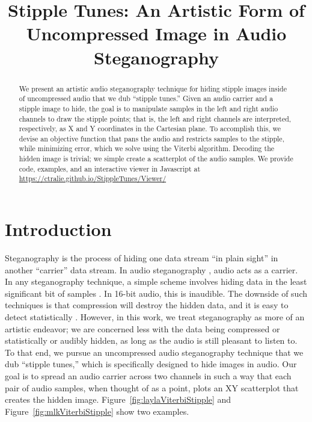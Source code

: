 \documentclass{article}
\title{Stipple Tunes: An Artistic Form of Uncompressed Image in Audio Steganography}
\begin{document}
%
\maketitle
%
\begin{abstract}
  We present an artistic audio steganography technique for hiding stipple images inside of uncompressed audio that we dub ``stipple tunes.''  Given an audio carrier and a stipple image to hide, the goal is to manipulate samples in the left and right audio channels to draw the stipple points; that is, the left and right channels are interpreted, respectively, as X and Y coordinates in the Cartesian plane.  To accomplish this, we devise an objective function that pans the audio and restricts samples to the stipple, while minimizing error, which we solve using the Viterbi algorithm.  Decoding the hidden image is trivial; we simple create a scatterplot of the audio samples.  We provide code, examples, and an interactive viewer in Javascript at \url{https://ctralie.github.io/StippleTunes/Viewer/}

\end{abstract}
%
\section{Introduction}\label{sec:introduction}

Steganography is the process of hiding one data stream ``in plain sight'' in another ``carrier'' data stream.  In audio steganography \cite{djebbar_comparative_2012, dutta_overview_2020}, audio acts as a carrier.  In any steganography technique, a simple scheme involves hiding data in the least significant bit of samples \cite{cvejic_wavelet_2002}.  In 16-bit audio, this is inaudible.  The downside of such techniques is that compression will destroy the hidden data, and it is easy to detect statistically \cite{fridrich2001reliable}.  However, in this work, we treat steganography as more of an artistic endeavor; we are concerned less with the data being compressed or statistically or audibly hidden, as long as the audio is still pleasant to listen to.  To that end, we pursue an uncompressed audio steganography technique that we dub ``stipple tunes,'' which is specifically designed to hide images in audio.  Our goal is to spread an audio carrier across two channels in such a way that each pair of audio samples, when thought of as a point, plots an XY scatterplot that creates the hidden image.  Figure~\ref{fig:laylaViterbiStipple} and Figure~\ref{fig:mlkViterbiStipple} show two examples.  
\end{document}
